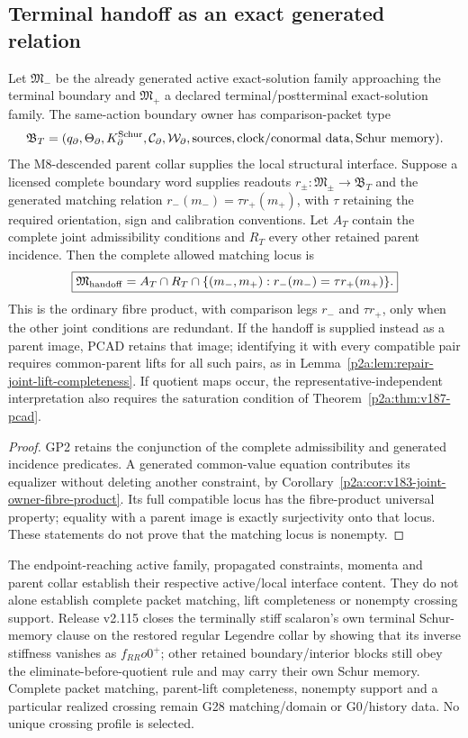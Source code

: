 \documentclass[12pt,a4paper]{article}
\begin{document}
\subsection{Terminal handoff as an exact generated relation}
\label{p8:sec:v183-terminal-handoff-family}
Let $\mathfrak M_-$ be the already generated active exact-solution family
approaching the terminal boundary and $\mathfrak M_+$ a declared
terminal/postterminal exact-solution family. The same-action boundary owner
has comparison-packet type
\[
 \mathfrak B_T=(q_\partial,\Theta_\partial,K_\partial^{\rm Schur},
 \mathcal C_\partial,\mathcal W_\partial,\text{sources},
 \text{clock/conormal data},\text{Schur memory}).
\]
The M8-descended parent collar supplies the local structural interface.
Suppose a licensed complete boundary word supplies readouts
$r_\pm:\mathfrak M_\pm\to\mathfrak B_T$ and the generated matching relation
$r_-(m_-)=\tau r_+(m_+)$, with $\tau$ retaining the required orientation,
sign and calibration conventions. Let $A_T$ contain the complete joint
admissibility conditions and $R_T$ every other retained parent incidence.
Then the complete allowed matching locus is
\[
 \boxed{\mathfrak M_{\rm handoff}
 =A_T\cap R_T\cap
 \{(m_-,m_+):r_-(m_-)=\tau r_+(m_+)\}.}
\]
This is the ordinary fibre product, with comparison legs $r_-$ and
$\tau r_+$, only when the other joint conditions are redundant. If the
handoff is supplied instead as a parent image, PCAD retains that image;
identifying it with every compatible pair requires common-parent lifts for
all such pairs, as in Lemma~\ref{p2a:lem:repair-joint-lift-completeness}.
If quotient maps occur, the representative-independent interpretation also
requires the saturation condition of Theorem~\ref{p2a:thm:v187-pcad}.

\begin{proof}
GP2 retains the conjunction of the complete admissibility and generated
incidence predicates. A generated common-value equation contributes its
equalizer without deleting another constraint, by
Corollary~\ref{p2a:cor:v183-joint-owner-fibre-product}. Its full compatible
locus has the fibre-product universal property; equality with a parent image
is exactly surjectivity onto that locus. These statements do not prove that
the matching locus is nonempty.
\end{proof}

The endpoint-reaching active family, propagated constraints, momenta and
parent collar establish their respective active/local interface content.
They do not alone establish complete packet matching, lift completeness or
nonempty crossing support.  Release v2.115 closes the terminally stiff scalaron's
own terminal Schur-memory clause on the restored regular Legendre collar by
showing that its inverse stiffness vanishes as $f_{RR}	o0^+$; other retained
boundary/interior blocks still obey the eliminate-before-quotient rule and may
carry their own Schur memory.  Complete packet matching, parent-lift
completeness, nonempty support and a particular realized crossing remain G28
matching/domain or G0/history data. No unique crossing profile is selected.
\end{document}
